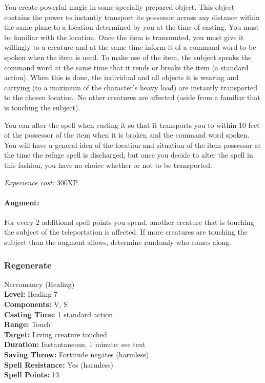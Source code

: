 You create powerful magic in some specially prepared object. 
This object contains the power to instantly transport its possessor across any distance within the same plane to a location determined by you at the time of casting.
You must be familiar with the location. 
Once the item is transmuted, you must give it willingly to a creature and at the same time inform it of a command word to be spoken when the item is used. 
To make use of the item, the subject speaks the command word at the same time that it rends or breaks the item (a standard action). 
When this is done, the individual and all objects it is wearing and carrying (to a maximum of the character's heavy load) 
are instantly transported to the chosen location. No other creatures are affected (aside from a familiar that is touching the subject).

You can alter the spell when casting it so that it transports you to within 10 feet of the possessor of the item when it is broken and the command word spoken. 
You will have a general idea of the location and situation of the item possessor at the time the refuge spell is discharged, 
but once you decide to alter the spell in this fashion, you have no choice whether or not to be transported.

\emph{Experience cost:} 300XP.

\paragraph{Augment:} For every 2 additional spell points you spend, another creature that is touching the subject of the teleportation is affected.
If more creatures are touching the subject than the augment allows, determine randomly who comes along.
\subsubsection{Regenerate}
\label{Spell:Regenerate}
Necromancy (Healing)
\\ \textbf{Level:} Healing 7
\\ \textbf{Components:} V, S
\\ \textbf{Casting Time:} 1 standard action
\\ \textbf{Range:} Touch
\\ \textbf{Target:} Living creature touched
\\ \textbf{Duration:} Instantaneous, 1 minute; see text
\\ \textbf{Saving Throw:} Fortitude negates (harmless)
\\ \textbf{Spell Resistance:} Yes (harmless)
\\ \textbf{Spell Points:} 13


